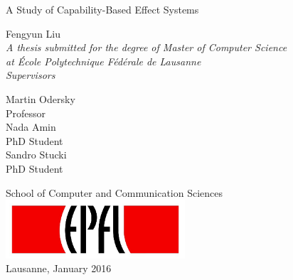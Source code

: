 \begin{titlepage}

  \begin{center}

    \vspace*{2\baselineskip}
    {\LARGE A Study of Capability-Based Effect Systems\\[2cm] }

    \noindent
    {\large Fengyun Liu} \\[2cm]

    \noindent
    \emph{A thesis submitted for the degree of Master of Computer
      Science \\
    at École Polytechnique Fédérale de Lausanne} \\[1.8cm]

    \textit{Supervisors}

    \noindent
    \begin{multicols}{3}
    {\large Martin Odersky} \\
    Professor \\
    \vfill
    \columnbreak
    {\large Nada Amin} \\
    PhD Student \\
    \vfill
    \columnbreak
    {\large Sandro Stucki}\\
    PhD Student \\
    \end{multicols}

    \vspace*{2\baselineskip}

    \noindent
    {School of Computer and Communication Sciences \\[1cm]}
    \includegraphics[width=0.5\textwidth]{img/epfl}~\\[1cm]
    \noindent
    Lausanne, January 2016 \\[1cm]



  \end{center}

\end{titlepage}
